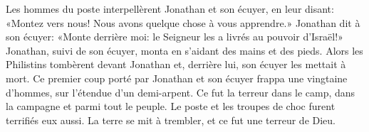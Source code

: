 Les hommes du poste interpellèrent Jonathan et son écuyer, en leur disant:
	«Montez vers nous! Nous avons quelque chose à vous apprendre.»
Jonathan dit à son écuyer:
	«Monte derrière moi: le Seigneur les a livrés au pouvoir d’Israël!»
Jonathan, suivi de son écuyer, monta en s’aidant des mains et des pieds.
Alors les Philistins tombèrent devant Jonathan
	et, derrière lui, son écuyer les mettait à mort.
Ce premier coup porté par Jonathan et son écuyer frappa une vingtaine d’hommes,
	sur l’étendue d’un demi-arpent.
Ce fut la terreur dans le camp, dans la campagne et parmi tout le peuple.
Le poste et les troupes de choc furent terrifiés eux aussi.
	La terre se mit à trembler, et ce fut une terreur de Dieu.

